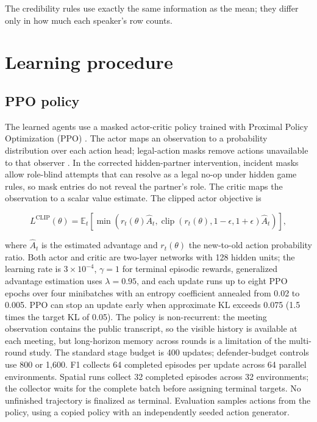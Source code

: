 \documentclass[
  12pt,
]{article}
\begin{document}
The credibility rules use exactly the same information as the mean; they
differ only in how much each speaker's row counts.

\FloatBarrier

\section{Learning procedure}\label{learning-procedure}

\FloatBarrier

\subsection{PPO policy}\label{ppo-policy}

The learned agents use a masked actor-critic policy trained with
Proximal Policy Optimization (PPO)
. The actor maps an observation to
a probability distribution over each action head; legal-action masks
remove actions unavailable to that observer
. In the corrected hidden-partner
intervention, incident masks allow role-blind attempts that can resolve
as a legal no-op under hidden game rules, so mask entries do not reveal
the partner's role. The critic maps the observation to a scalar value
estimate. The clipped actor objective is

\[
L^{\mathrm{CLIP}}(\theta) =
\mathbb{E}_t\left[\min\left(r_t(\theta)\hat A_t,
\operatorname{clip}(r_t(\theta),1-\epsilon,1+\epsilon)\hat A_t\right)\right],
\]

where \(\hat A_t\) is the estimated advantage and \(r_t(\theta)\) the
new-to-old action probability ratio. Both actor and critic are two-layer
networks with 128 hidden units; the learning rate is \(3\times10^{-4}\),
\(\gamma = 1\) for terminal episodic rewards, generalized advantage
estimation uses \(\lambda = 0.95\), and each update runs up to eight PPO
epochs over four minibatches with an entropy coefficient annealed from
0.02 to 0.005. PPO can stop an update early when approximate KL exceeds
0.075 (1.5 times the target KL of 0.05). The policy is non-recurrent:
the meeting observation contains the public transcript, so the visible
history is available at each meeting, but long-horizon memory across
rounds is a limitation of the multi-round study. The standard stage
budget is 400 updates; defender-budget controls use 800 or 1,600. F1
collects 64 completed episodes per update across 64 parallel
environments. Spatial runs collect 32 completed episodes across 32
environments; the collector waits for the complete batch before
assigning terminal targets. No unfinished trajectory is finalized as
terminal. Evaluation samples actions from the policy, using a copied
policy with an independently seeded action generator.
\end{document}
